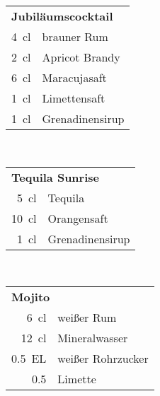 \begin{table}[h!]
  \vspace{1cm}
  \begin{subtable}[t]{0.3\textwidth}
    \centering
    \vspace{0pt}
    \begin{tabular}{|rl|} \hline
      \multicolumn{2}{|l|}{\textbf{Jubiläumscocktail}} \\
      \SI{4}{\centi\litre} & brauner Rum \\
      \SI{2}{\centi\litre} & Apricot Brandy \\
      \SI{6}{\centi\litre} & Maracujasaft \\
      \SI{1}{\centi\litre} & Limettensaft \\
      \SI{1}{\centi\litre} & Grenadinensirup \\ \hline
    \end{tabular}
  \end{subtable}
  ~
  \begin{subtable}[t]{0.3\textwidth}
    \centering
    \vspace{0pt}
    \begin{tabular}{|rl|} \hline
      \multicolumn{2}{|l|}{\textbf{Tequila Sunrise}} \\
      \SI{5}{\centi\litre} & Tequila \\
      \SI{10}{\centi\litre} & Orangensaft \\
      \SI{1}{\centi\litre} & Grenadinensirup \\ \hline
    \end{tabular}
  \end{subtable}
  ~
  \begin{subtable}[t]{0.3\textwidth}
    \centering
    \vspace{0pt}
    \begin{tabular}{|rl|} \hline
      \multicolumn{2}{|l|}{\textbf{Mojito}} \\
      \SI{6}{\centi\litre} & weißer Rum \\
      \SI{12}{\centi\litre} & Mineralwasser \\
      \SI{0.5}{EL} & weißer Rohrzucker \\
      \num{0.5} & Limette \\ \hline
    \end{tabular}
  \end{subtable}


\end{table}
